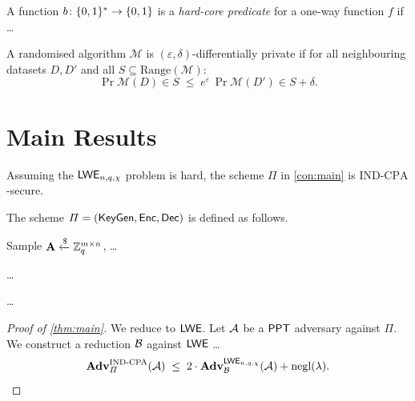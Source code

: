 \documentclass[11pt, a4paper]{article}
\begin{document}
\begin{definition}
  \label{def:hardcore}
  A function $b \colon \{0,1\}^* \to \{0,1\}$ is a \emph{hard-core predicate} for a
  one-way function $f$ if \ldots
\end{definition}

\begin{definition}
  A randomised algorithm $\mathcal{M}$ is $(\varepsilon,\delta)$-differentially
  private if for all neighbouring datasets $D, D'$ and all $S \subseteq \mathrm{Range}(\mathcal{M})$:
  \[
    \Pr{\mathcal{M}(D) \in S} \;\le\; e^{\varepsilon}\,\Pr{\mathcal{M}(D') \in S} + \delta.
  \]
\end{definition}

\section{Main Results}
\label{sec:results}

\begin{theorem}
  \label{thm:main}
  Assuming the $\mathsf{LWE}_{n,q,\chi}$ problem is hard,
  the scheme $\Pi$ in \cref{con:main} is $\mathrm{IND\text{-}CPA}$-secure.
\end{theorem}

\begin{construction}
  \label{con:main}
  The scheme $\Pi = (\mathsf{KeyGen}, \mathsf{Enc}, \mathsf{Dec})$ is defined as follows.
  \begin{description}[leftmargin=2em]
    \item[$\KeyGen(1^\secpar)$:] Sample $\mathbf{A} \xleftarrow{\$} \mathbb{Z}_q^{m \times n}$, \ldots
    \item[$\Enc(\pk, \mu)$:] \ldots
    \item[$\Dec(\sk, \ct)$:] \ldots
  \end{description}
\end{construction}

\begin{proof}[Proof of \cref{thm:main}]
  We reduce to $\mathsf{LWE}$.
  Let $\mathcal{A}$ be a $\mathsf{PPT}$ adversary against $\Pi$.
  We construct a reduction $\mathcal{B}$ against $\mathsf{LWE}$ \ldots
  \[
    \mathbf{Adv}^{\mathrm{IND\text{-}CPA}}_{\Pi}(\mathcal{A}) \;\le\;
    2 \cdot \mathbf{Adv}^{\mathsf{LWE}_{n,q,\chi}}_{\mathcal{B}}(\mathcal{A}) + \mathrm{negl}(\lambda).
  \]
\end{proof}
\end{document}

